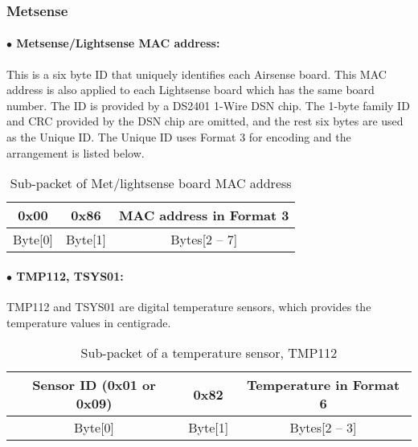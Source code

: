 \subsubsection{Metsense}

\paragraph{$\bullet$ Metsense/Lightsense MAC address: }

This is a six byte ID that uniquely identifies each Airsense board. This MAC address is also applied to each Lightsense board which has the same board number. The ID is provided by a DS2401 1-Wire DSN chip. The 1-byte family ID and CRC provided by the DSN chip are omitted, and the rest six bytes are used as the Unique ID. The Unique ID uses Format 3 for encoding and the arrangement is listed below.


\begin{table}[h!]
    \centering
    \caption{Sub-packet of Met/lightsense board MAC address}
    \begin{tabular}{|c|c|c|}
        \hline
        \rowcolor{black!8}
        \textbf{0x00} & \textbf{0x86} & \textbf{MAC address in Format 3} \\
        \hline
        Byte[0] & Byte[1] & Bytes[2 -- 7]\\ \hline
    \end{tabular}
\end{table}
\par

\paragraph{$\bullet$ TMP112, TSYS01:}

TMP112 and TSYS01 are digital temperature sensors, which provides the temperature values
in centigrade.

\begin{table}[h!]
    \centering
    \caption{Sub-packet of a temperature sensor, TMP112}
    \begin{tabular}{|c|c|c|}
        \hline
        \rowcolor{black!8}
        \textbf{Sensor ID} (0x01 or 0x09) & \textbf{0x82} & \textbf{Temperature in Format 6} \\
        \hline
        Byte[0] & Byte[1] & Bytes[2 -- 3]\\ \hline
    \end{tabular}
\end{table}



